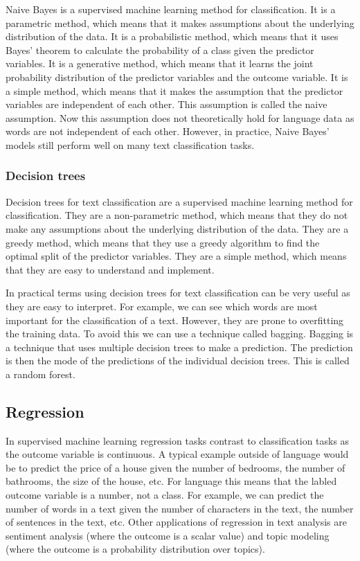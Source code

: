 \documentclass[
  letterpaper,
]{scrbook}
\begin{document}
Naive Bayes is a supervised machine learning method for classification.
It is a parametric method, which means that it makes assumptions about
the underlying distribution of the data. It is a probabilistic method,
which means that it uses Bayes' theorem to calculate the probability of
a class given the predictor variables. It is a generative method, which
means that it learns the joint probability distribution of the predictor
variables and the outcome variable. It is a simple method, which means
that it makes the assumption that the predictor variables are
independent of each other. This assumption is called the naive
assumption. Now this assumption does not theoretically hold for language
data as words are not independent of each other. However, in practice,
Naive Bayes' models still perform well on many text classification
tasks.

\hypertarget{pda-decision-trees}{%
\subsubsection{Decision trees}\label{pda-decision-trees}}

Decision trees for text classification are a supervised machine learning
method for classification. They are a non-parametric method, which means
that they do not make any assumptions about the underlying distribution
of the data. They are a greedy method, which means that they use a
greedy algorithm to find the optimal split of the predictor variables.
They are a simple method, which means that they are easy to understand
and implement.

In practical terms using decision trees for text classification can be
very useful as they are easy to interpret. For example, we can see which
words are most important for the classification of a text. However, they
are prone to overfitting the training data. To avoid this we can use a
technique called bagging. Bagging is a technique that uses multiple
decision trees to make a prediction. The prediction is then the mode of
the predictions of the individual decision trees. This is called a
random forest.

\hypertarget{pda-regression}{%
\subsection{Regression}\label{pda-regression}}

In supervised machine learning regression tasks contrast to
classification tasks as the outcome variable is continuous. A typical
example outside of language would be to predict the price of a house
given the number of bedrooms, the number of bathrooms, the size of the
house, etc. For language this means that the labled outcome variable is
a number, not a class. For example, we can predict the number of words
in a text given the number of characters in the text, the number of
sentences in the text, etc. Other applications of regression in text
analysis are sentiment analysis (where the outcome is a scalar value)
and topic modeling (where the outcome is a probability distribution over
topics).
\end{document}
